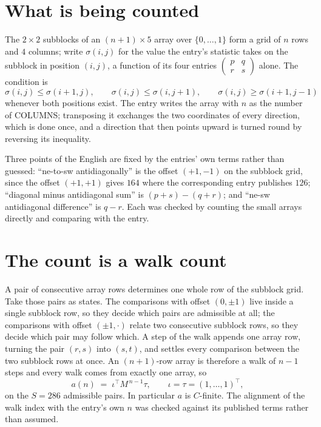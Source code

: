 \documentclass[11pt,a4paper]{article}
\theoremstyle{plain}
\theoremstyle{definition}
\begin{document}
\section{What is being counted}

The $2\times2$ subblocks of an $(n+1)\times5$ array over $\{0,\dots,1\}$ form a grid
of $n$ rows and $4$ columns; write $\sigma(i,j)$ for the value the entry's statistic takes on
the subblock in position $(i,j)$, a function of its four entries
$\begin{pmatrix}p&q\\r&s\end{pmatrix}$ alone. The condition is
\[
\sigma(i,j)\le\sigma(i+1,j),\qquad \sigma(i,j)\le\sigma(i,j+1),\qquad \sigma(i,j)\ge\sigma(i+1,j-1)
\]
whenever both positions exist. The entry writes the array with $n$ as the number of COLUMNS; transposing it exchanges the two coordinates of every direction, which is done once, and a direction that then points upward is turned round by reversing its inequality.

Three points of the English are fixed by the entries' own terms rather than guessed:
``ne-to-sw antidiagonally'' is the offset $(+1,-1)$ on the subblock grid, since the offset
$(+1,+1)$ gives $164$ where the corresponding entry publishes $126$; ``diagonal minus
antidiagonal sum'' is $(p+s)-(q+r)$; and ``ne-sw antidiagonal difference'' is $q-r$. Each was
checked by counting the small arrays directly and comparing with the entry.

\section{The count is a walk count}

A pair of consecutive array rows determines one whole row of the subblock grid. Take those
pairs as states. The comparisons with offset $(0,\pm1)$ live inside a single subblock row, so
they decide which pairs are admissible at all; the comparisons with offset $(\pm1,\cdot)$
relate two consecutive subblock rows, so they decide which pair may follow which. A step of the
walk appends one array row, turning the pair $(r,s)$ into $(s,t)$, and settles every comparison
between the two subblock rows at once. An $(n+1)$-row array is therefore a walk of $n-1$ steps
and every walk comes from exactly one array, so
\[
a(n)\;=\;\iota^{\!\top}M^{\,n-1}\tau,\qquad \iota=\tau=(1,\dots,1)^{\!\top},
\]
on the $S=286$ admissible pairs. In particular $a$ is $C$-finite. The alignment of the walk
index with the entry's own $n$ was checked against its published terms rather than assumed.
\end{document}

